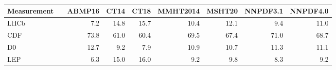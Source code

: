 \begin{tabular}{l@{\extracolsep{\fill}}rrrrrrrr}
  \hline \hline
Measurement &               &    ABMP16  &      CT14  &      CT18  &  MMHT2014  &    MSHT20  &   NNPDF3.1  &   NNPDF4.0 \\
\hline
LHCb   &    &     7.2  &    14.8  &    15.7  &    10.4  &    12.1  &     9.4  &    11.0 \\
                CDF   &  &    73.8  &    61.0  &    60.4  &    69.5  &    67.4  &    71.0  &    68.7 \\
                         D0    &  &    12.7  &     9.2  &     7.9  &    10.9  &    10.7  &    11.3  &    11.1 \\
                                 LEP &       &     6.3  &    15.0  &    16.0  &     9.2  &     9.8  &     8.3  &     9.2 \\
\hline \hline 
\end{tabular}
